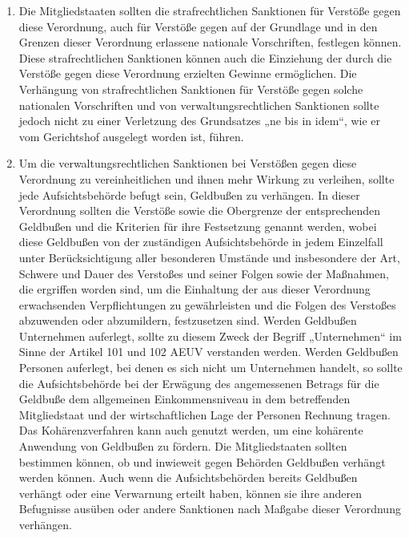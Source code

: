 \begin{enumerate}
   \item Die Mitgliedstaaten sollten die strafrechtlichen Sanktionen für Verstöße gegen diese Verordnung, auch für
    Verstöße gegen auf der Grundlage und in den Grenzen dieser Verordnung erlassene nationale Vorschriften, festlegen
    können. Diese strafrechtlichen Sanktionen können auch die Einziehung der durch die Verstöße gegen diese Verordnung
    erzielten Gewinne ermöglichen. Die Verhängung von strafrechtlichen Sanktionen für Verstöße gegen solche nationalen
    Vorschriften und von verwaltungsrechtlichen Sanktionen sollte jedoch nicht zu einer Verletzung des Grundsatzes „ne
    bis in idem“, wie er vom Gerichtshof ausgelegt worden ist, führen.%
   \label{itm:eg-149}
   

   \item Um die verwaltungsrechtlichen Sanktionen bei Verstößen gegen diese Verordnung zu vereinheitlichen und ihnen
    mehr Wirkung zu verleihen, sollte jede Aufsichtsbehörde befugt sein, Geldbußen zu verhängen. In dieser Verordnung
    sollten die Verstöße sowie die Obergrenze der entsprechenden Geldbußen und die Kriterien für ihre Festsetzung
    genannt werden, wobei diese Geldbußen von der zuständigen Aufsichtsbehörde in jedem Einzelfall unter
    Berücksichtigung aller besonderen Umstände und insbesondere der Art, Schwere und Dauer des Verstoßes und seiner
    Folgen sowie der Maßnahmen, die ergriffen worden sind, um die Einhaltung der aus dieser Verordnung erwachsenden
    Verpflichtungen zu gewährleisten und die Folgen des Verstoßes abzuwenden oder abzumildern, festzusetzen sind.
    Werden Geldbußen Unternehmen auferlegt, sollte zu diesem Zweck der Begriff „Unternehmen“ im Sinne der Artikel 101
    und 102 AEUV verstanden werden. Werden Geldbußen Personen auferlegt, bei denen es sich nicht um Unternehmen
    handelt, so sollte die Aufsichtsbehörde bei der Erwägung des angemessenen Betrags für die Geldbuße dem allgemeinen
    Einkommensniveau in dem betreffenden Mitgliedstaat und der wirtschaftlichen Lage der Personen Rechnung tragen. Das
    Kohärenzverfahren kann auch genutzt werden, um eine kohärente Anwendung von Geldbußen zu fördern. Die
    Mitgliedstaaten sollten bestimmen können, ob und inwieweit gegen Behörden Geldbußen verhängt werden können. Auch
    wenn die Aufsichtsbehörden bereits Geldbußen verhängt oder eine Verwarnung erteilt haben, können sie ihre anderen
    Befugnisse ausüben oder andere Sanktionen nach Maßgabe dieser Verordnung verhängen.%
   \label{itm:eg-150}
   

\end{enumerate}
